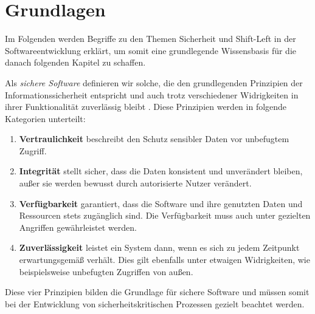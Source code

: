 \section{Grundlagen}

Im Folgenden werden Begriffe zu den Themen Sicherheit und Shift-Left in der Softwareentwicklung erklärt, um somit eine grundlegende Wissensbasis für die danach folgenden Kapitel zu schaffen.

Als \textit{sichere Software} definieren wir solche, die den grundlegenden Prinzipien der Informationssicherheit \cite{blakley_information_2001} entspricht und auch trotz verschiedener Widrigkeiten in ihrer Funktionalität zuverlässig bleibt \cite{oueslati_literature_2015}. Diese Prinzipien werden in folgende Kategorien unterteilt:
\begin{enumerate}
    \item \textbf{Vertraulichkeit} beschreibt den Schutz sensibler Daten vor unbefugtem Zugriff.
    \item \textbf{Integrität} stellt sicher, dass die Daten konsistent und unverändert bleiben, außer sie werden bewusst durch autorisierte Nutzer verändert.
    \item \textbf{Verfügbarkeit} garantiert, dass die Software und ihre genutzten Daten und Ressourcen stets zugänglich sind. Die Verfügbarkeit muss auch unter gezielten Angriffen gewährleistet werden.
    \item \textbf{Zuverlässigkeit} leistet ein System dann, wenn es sich zu jedem Zeitpunkt erwartungsgemäß verhält. Dies gilt ebenfalls unter etwaigen Widrigkeiten, wie beispielsweise unbefugten Zugriffen von außen.
\end{enumerate}
Diese vier Prinzipien bilden die Grundlage für sichere Software und müssen somit bei der Entwicklung von sicherheitskritischen Prozessen gezielt beachtet werden.\

